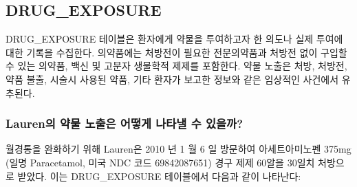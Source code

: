 \documentclass[11pt]{book}
\theoremstyle{definition}
\theoremstyle{definition}
\theoremstyle{definition}
\theoremstyle{remark}
\begin{document}
\subsection{DRUG\_EXPOSURE}\label{drugExposure}

DRUG\_EXPOSURE 테이블은 환자에게 약물을 투여하고자 한 의도나 실제 투여에
대한 기록을 수집한다. 의약품에는 처방전이 필요한 전문의약품과 처방전
없이 구입할 수 있는 의약품, 백신 및 고분자 생물학적 제제를 포함한다.
약물 노출은 처방, 처방전, 약품 불출, 시술시 사용된 약품, 기타 환자가
보고한 정보와 같은 임상적인 사건에서 유추된다.

\subsubsection*{Lauren의 약물 노출은 어떻게 나타낼 수
있을까?}\label{lauren------}

월경통을 완화하기 위해 Lauren은 2010 년 1 월 6 일 방문하여
아세트아미노펜 375mg (일명 Paracetamol, 미국 NDC 코드 69842087651) 경구
제제 60알을 30일치 처방으로 받았다. 이는 DRUG\_EXPOSURE 테이블에서
다음과 같이 나타난다:
\end{document}
